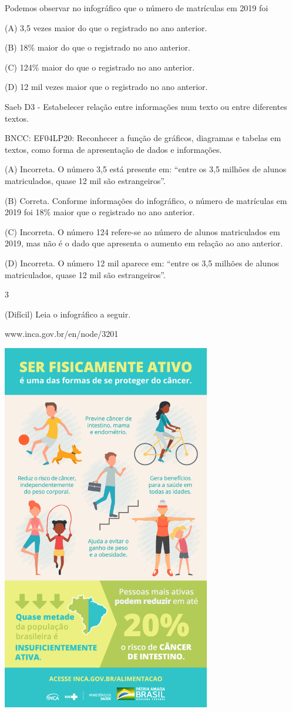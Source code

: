 \begin{escolha}
\begin{escolha}
{Podemos observar no infográfico que o número de matrículas em 2019 foi

(A) 3,5 vezes maior do que o registrado no ano anterior.

(B) 18\% maior do que o registrado no ano anterior.

(C) 124\% maior do que o registrado no ano anterior.

(D) 12 mil vezes maior que o registrado no ano anterior.

Saeb D3 - Estabelecer relação entre informações num texto ou entre
diferentes textos.

BNCC: EF04LP20: Reconhecer a função de gráficos, diagramas e tabelas em
textos, como forma de apresentação de dados e informações.

(A) Incorreta. O número 3,5 está presente em: ``entre os 3,5 milhões de
alunos matriculados, quase 12 mil são estrangeiros''.

(B) Correta. Conforme informações do infográfico, o número de matrículas
em 2019 foi 18\% maior que o registrado no ano anterior.

(C) Incorreta. O número 124 refere-se ao número de alunos matriculados
em 2019, mas não é o dado que apresenta o aumento em relação ao ano
anterior.

(D) Incorreta. O número 12 mil aparece em: ``entre os 3,5 milhões de
alunos matriculados, quase 12 mil são estrangeiros''.

\num{3}

(Difícil) Leia o infográfico a seguir.

www.inca.gov.br/en/node/3201

\includegraphics[width=3.58333in,height=6.36458in]{media/image34.jpeg}

}
\end{escolha}
\end{escolha}
